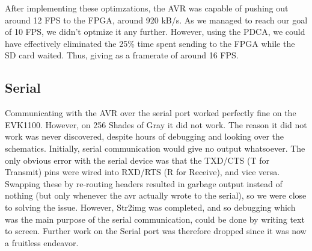 After implementing these optimzations, the AVR was capable of pushing out around
12 FPS to the \ac{FPGA}, around 920 kB/s. As we managed to reach our goal of 10
FPS, we didn't optmize it any further. However, using the \ac{PDCA}, we could
have effectively eliminated the 25\% time spent sending to the \ac{FPGA} while
the \ac{SD} card waited. Thus, giving as a framerate of around 16
FPS. 

\subsection{Serial}
\label{sec:avr-serial-issues}
Communicating with the AVR over the serial port worked perfectly fine on the
EVK1100. However, on 256 Shades of Gray it did not work. The reason it did not
work was never discovered, despite hours of debugging and looking over the
schematics. Initially, serial communication would give no output whatsoever. The
only obvious error with the serial device was that the TXD/CTS (T for Transmit)
pins were wired into RXD/RTS (R for Receive), and vice versa. Swapping these by
re-routing headers resulted in garbage output instead of nothing (but only
whenever the avr actually wrote to the serial), so we were close to solving the
issue. However, Str2img was completed, and so debugging which was the main
purpose of the serial communication, could be done by writing text to
screen. Further work on the Serial port was therefore dropped since it was now a
fruitless endeavor.
